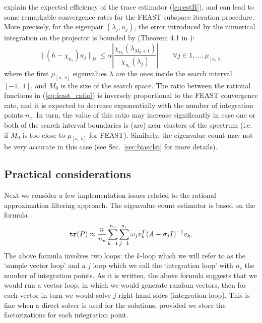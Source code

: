 \documentclass[12pt]{article}		\usepackage{tabls,multirow}
\def\trace{\mbox{\tt tr}}
\newcommand{\ab}{[a, \ b]}
\def\inv{^{-1}}\def\backw{{\bf B}}\def\diag{\mbox{Diag}\,}
\newcommand{\eq}[1]{\begin{equation}\label{#1}}
\newcommand{\en}{\end{equation}}
\begin{document}
explain the expected efficiency of the trace estimator
(\ref{eq:estR}), and can lead to some remarkable convergence rates for
the FEAST subspace iteration procedure.  More precisely, for the
eigenpair $(\lambda_j, u_j)$, the error introduced by the numerical
integration on the projector is bounded by (Theorem 4.1 in
\cite{Tang13}):
\begin{equation}
\|(h - \chi_{n_c})u_j\|_B \leq \alpha\left|\frac{\chi_{n_c}(\lambda_{M_0+1})}{\chi_{n_c}(\lambda_{j})}\right| \quad \quad \forall j\in 
1,\dots,\mu_{\ab} 
\label{eq:feast_ratio}
\end{equation}
where the first $\mu_{\ab}$ eigenvalues $\lambda$ are the ones
inside the search interval $[-1, \ 1]$, and $M_0$ is the size of the
search space. The ratio between the rational functions in
(\ref{eq:feast_ratio}) is inversely proportional to the FEAST
convergence rate, and it is expected to decrease exponentially with
the number of integration points $n_c$. In turn, the value of this ratio
may increase significantly in case one or both of the search interval
boundaries is (are) near clusters of the spectrum (i.e. if $M_0$ is
too close to $\mu_{\ab}$ for FEAST). Similarly, the eigenvalue
count may not be very accurate in this case (see
Sec.~\ref{sec:biasclst} for more details).


\subsection{Practical considerations}
\label{sec:cons} 
Next we consider a few implementation issues related to the rational
approximation filtering approach.  The eigenvalue count estimator is
based on the formula \eq{eq:est} \trace (P ) \approx \frac{n}{n_v}
\sum_{k=1}^{n_v} \sum_{j=1}^{n_c} \omega_j v_k^T (A - \sigma_j I)\inv
v_k .  \en The above formula involves two loops: the $k$-loop which we
will refer to as the `sample vector loop' and a $j$ loop which we call
the `integration loop' with $n_c$ the number of integration points.
As it is written, the above formula suggests that we would run a
vector loop, in which we would generate random vectors, then for each
vector in turn we would solve $j$ right-hand sides (integration loop).
This is fine when a direct solver is used for the solutions, provided
we store the factorizations for each integration point.
 
\end{document}
